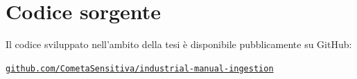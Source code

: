 \chapter*{Codice sorgente}

Il codice sviluppato nell'ambito della tesi è disponibile pubblicamente su GitHub:

\begin{center}
\href{https://github.com/CometaSensitiva/industrial-manual-ingestion}
{\texttt{github.com/CometaSensitiva/industrial-manual-ingestion}}
\end{center}